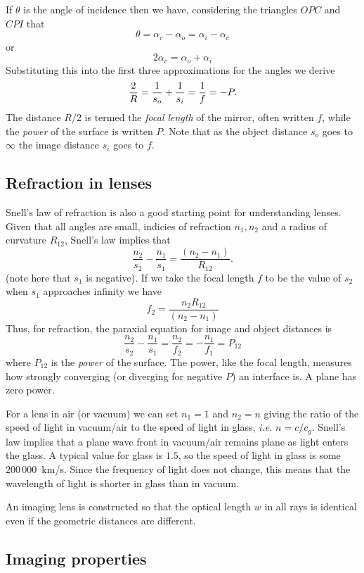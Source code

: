 If $\theta$ is the angle of incidence then we have, considering the triangles $OPC$ and $CPI$ 
that 
\[ 
\theta=\alpha_c-\alpha_o=\alpha_i-\alpha_c
\]
or
\[ 
2\alpha_c=\alpha_o+\alpha_i
\]
Substituting this into the first three approximations for the angles we derive
\[
{2\over R}={1\over s_o}+{1\over s_i}={1\over f}=-P.
\]
The distance $R/2$ is termed the {\it focal length} of the mirror, often written $f$, while
the {\it power} of the surface is written $P$. Note that as the object distance
$s_o$ goes to $\infty$ the image distance $s_i$ goes to $f$.

\subsection{Refraction in lenses} %

Snell's law of refraction is also a good starting point for
understanding lenses.
Given that all angles are small, indicies of refraction $n_1,n_2$ and
a radius of curvature $R_{12}$, Snell's law implies that
\[
\frac{n_2}{s_2}-\frac{n_1}{s_1}=\frac{(n_2-n_1)}{R_{12}}.
\]
(note here that $s_1$ is negative).
If we take the focal length $f$ to be the value of $s_2$ when $s_1$
approaches infinity we have
\[
f_2=\frac{n_2R_{12}}{(n_2-n_1)}
\]
Thus, for refraction, the paraxial equation for image and object
distances is
\[
\frac{n_2}{s_2}-\frac{n_1}{s_1}=\frac{n_2}{f_2}=-\frac{n_1}{f_1}=P_{12}
\]
where $P_{12}$ is the {\it power} of the surface. The power, like the
focal length, measures how strongly converging (or diverging for
negative $P$) an interface is. A plane has zero power.

For a lens in air (or vacuum) we can set $n_1=1$ and $n_2=n$ giving the ratio of the speed of light
in vacuum/air to the speed of light in glass, {\it i.e.} $n={c/c_g}$. Snell's 
law implies that a plane wave front in vacuum/air remains plane as light 
enters the glass. A typical value for glass is $1.5$, so the speed of light 
in glass is some $200\,000$~km/s. Since the frequency of light does not change,
this means that the wavelength of light is shorter in glass than in vacuum.

An imaging lens is constructed so that the optical length $w$ in all rays is 
identical even if the geometric distances are different. 

\subsection{Imaging properties}

